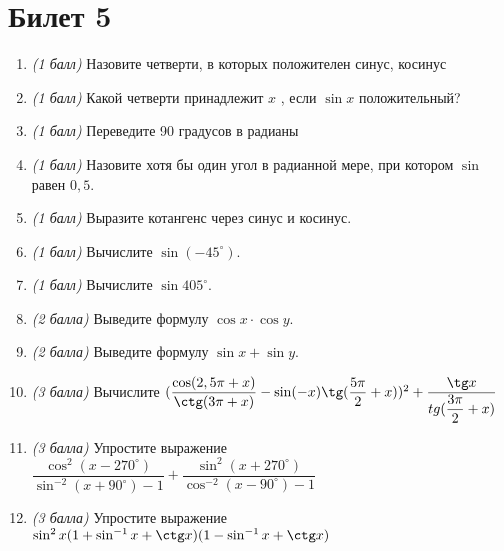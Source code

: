 \documentclass[12pt, a4paper]{article}
\begin{document}
	\section*{Билет 5}
	\begin{enumerate}
		\item \textit{(1 балл)}	Назовите четверти, в которых положителен синус, косинус 
		\item \textit{(1 балл)}	Какой четверти принадлежит $x$ , если $\sin x$ положительный?
		\item \textit{(1 балл)}	Переведите 90 градусов в радианы
		\item \textit{(1 балл)}	Назовите хотя бы один угол в радианной мере, при котором $\sin$  равен $0,5$.
		\item \textit{(1 балл)}	Выразите котангенс через синус и косинус.
		\item \textit{(1 балл)} Вычислите $\sin (-45^{\circ})$.
		\item \textit{(1 балл)}	Вычислите $\sin 405^{\circ}$.
		\item \textit{(2 балла)} Выведите формулу $\cos x \cdot \cos y$.
		\item \textit{(2 балла)} Выведите формулу $\sin x + \sin y$.
		\item \textit{(3 балла)} Вычислите $(\dfrac{\cos (2,5\pi + x)}{\ctg (3\pi + x)} - \sin (-x) \tg (\dfrac{5\pi}{2}+x))^2 + \dfrac{\tg x}{tg (\dfrac{3\pi}{2}+x)}$
		\item \textit{(3 балла)} Упростите выражение $\dfrac{\cos^2 (x-270^{\circ})}{\sin^{-2}(x+90^{\circ})-1}+\dfrac{\sin^2 (x+270^{\circ})}{\cos^{-2}(x-90^{\circ})-1}$
		\item \textit{(3 балла)} Упростите выражение $\sin^2 x(1+\sin^{-1}x + \ctg x)(1 - \sin^{-1}x + \ctg x)$
	\end{enumerate}
\end{document}
